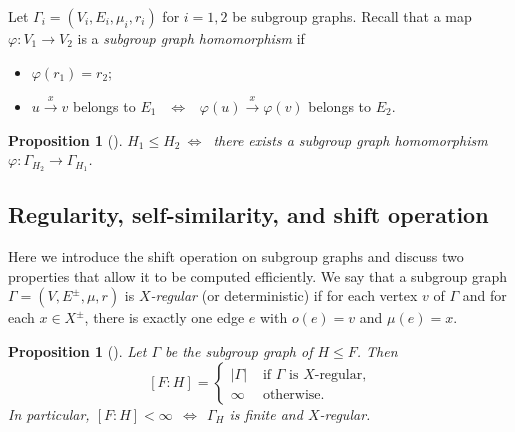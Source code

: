 \documentclass[12pt,oneside]{amsart}
\newtheorem{proposition}[theorem]{Proposition}
\theoremstyle{definition}
\theoremstyle{case}
\begin{document}
Let $\Gamma_i=(V_i,E_i,\mu_i,r_i)$ for $i=1,2$ be subgroup graphs.
Recall that a map $\varphi:V_1\to V_2$ 
is a \emph{subgroup graph homomorphism} if
\begin{itemize}
\item 
$\varphi(r_1)=r_2$;
\item 
$u\stackrel{x}{\to} v$ belongs to $E_1$
$\ \ \Leftrightarrow\ \ $
$\varphi(u)\stackrel{x}{\to} \varphi(v)$ belongs to $E_2$.
\end{itemize}

\begin{proposition}[{{\cite[Lemma 4.1 and Proposition 4.3]{Kapovich_Miasnikov:2002}}}]
$H_1\le H_2\ \Leftrightarrow\ $ there exists a subgroup graph homomorphism
$\varphi:\Gamma_{H_2}\to \Gamma_{H_1}$.
\end{proposition}


\subsection{Regularity, self-similarity, and shift operation}
\label{se:shift}

Here we introduce the shift operation on subgroup graphs 
and discuss two properties that allow it to be computed efficiently.
We say that a subgroup graph $\Gamma = (V,E^\pm,\mu,r)$
is \emph{$X$-regular} (or deterministic) 
if for each vertex $v$ of $\Gamma$
and for each $x\in X^{\pm}$, there is exactly one edge $e$ 
with $o(e)=v$ and $\mu(e)=x$.

\begin{proposition}[{{\cite[cf. Proposition 8.3]{Kapovich_Miasnikov:2002}}}]
Let $\Gamma$ be the subgroup graph of $H\le F$.
Then
$$
[F:H]=
\begin{cases}
|\Gamma| & \mbox{ if } \Gamma \mbox{ is $X$-regular,}\\
\infty & \mbox{ otherwise.}
\end{cases}
$$
In particular,
$[F:H]<\infty\ \ \Leftrightarrow\ \ \Gamma_H$
is finite and $X$-regular.
\end{proposition}
\end{document}
